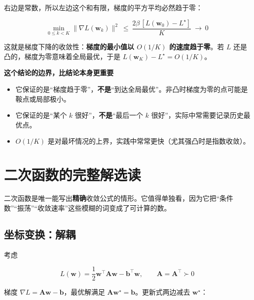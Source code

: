 \documentclass[UTF8, a4paper, zihao=-4, fontset=none]{ctexart}
\begin{document}
右边是常数，所以左边这个和有限，梯度的平方平均必然趋于零：


\[
\min_{0\le k<K}\|\nabla L(\mathbf{w}_k)\|^2\ \le\ \frac{2\beta\,[L(\mathbf{w}_0)-L^\star]}{K}\ \longrightarrow\ 0
\]


这就是梯度下降的收敛性：\textbf{梯度的最小值以 $O(1/K)$ 的速度趋于零}。若 $L$ 还是凸的，梯度为零意味着全局最优，于是 $L(\mathbf{w}_K)-L^\star=O(1/K)$。



\begin{infobox}
{\bfseries\sffamily\small\color{accent} 这个结论的边界，比结论本身更重要}\par\vspace{2pt}
\begin{itemize}
\item 它保证的是“梯度趋于零”，\textbf{不是}“到达全局最优”。非凸时梯度为零的点可能是鞍点或局部极小。
\item 它保证的是“某个 $k$ 很好”，\textbf{不是}“最后一个 $k$ 很好”，实际中常需要记录历史最优点。
\item $O(1/K)$ 是对最坏情况的上界，实践中常常更快（尤其强凸时是指数收敛）。
\end{itemize}


\end{infobox}




\section[二次函数的完整解]{二次函数的完整解\hfill{\normalfont\sffamily\small\color{accent}选读}}



二次函数是唯一能写出\textbf{精确}收敛公式的情形。它值得单独看，因为它把“条件数”“振荡”“收敛速率”这些模糊的词变成了可计算的数。




\subsection{坐标变换：解耦}



考虑


\[
L(\mathbf{w})=\frac12\mathbf{w}^\top\mathbf{A}\mathbf{w}-\mathbf{b}^\top\mathbf{w},\qquad \mathbf{A}=\mathbf{A}^\top\succ0
\]


梯度 $\nabla L=\mathbf{A}\mathbf{w}-\mathbf{b}$，最优解满足 $\mathbf{A}\mathbf{w}^\star=\mathbf{b}$。更新式两边减去 $\mathbf{w}^\star$：
\end{document}
